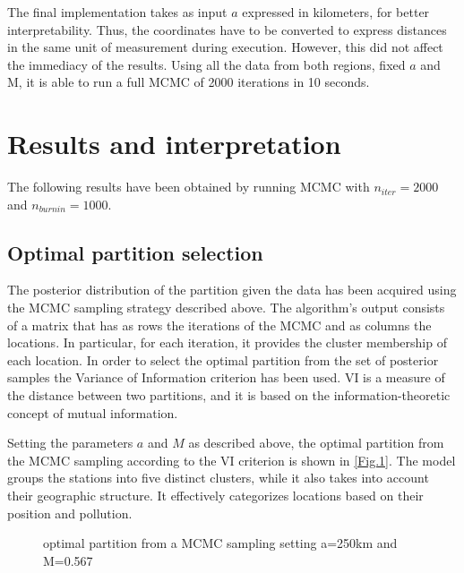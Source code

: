 \documentclass[12pt,a4paper]{article}
\begin{document}
The final implementation takes as input $a$ expressed in kilometers, for better interpretability. Thus, the coordinates have to be converted to express distances in the same unit of measurement during execution.
However, this did not affect the immediacy of the results.
Using all the data from both regions, fixed $a$ and M, it is able to run a full MCMC of 2000 iterations in 10 seconds.


\newpage
\section{Results and interpretation}\label{sec:res}

 The following results have been obtained by running MCMC with $n_{iter}=2000$ and \newline $n_{burn in}=1000$.

\subsection{Optimal partition selection}
 The posterior distribution of the partition given the data has been acquired using the MCMC sampling strategy described above.
 The algorithm's output consists of a matrix that has as rows the iterations of the MCMC and as columns the locations. In particular, for each iteration, it provides the cluster membership of each location.
 In order to select the optimal partition from the set of posterior samples the Variance of Information criterion has been used. VI is a measure of the distance between two partitions, and it is based on the information-theoretic concept of mutual information.

Setting the parameters $a$ and $M$ as described above, the optimal partition from the MCMC sampling according to the VI criterion is shown in  \autoref{Fig.1}.
The model groups the stations into five distinct clusters, while it also takes into account their geographic structure. It effectively categorizes locations based on their position and pollution.
\begin{figure}[H]
\centering
 
\caption{optimal partition from a  MCMC sampling setting a=250km and M=0.567}
\label{Fig.1}
\end{figure}
\end{document}

